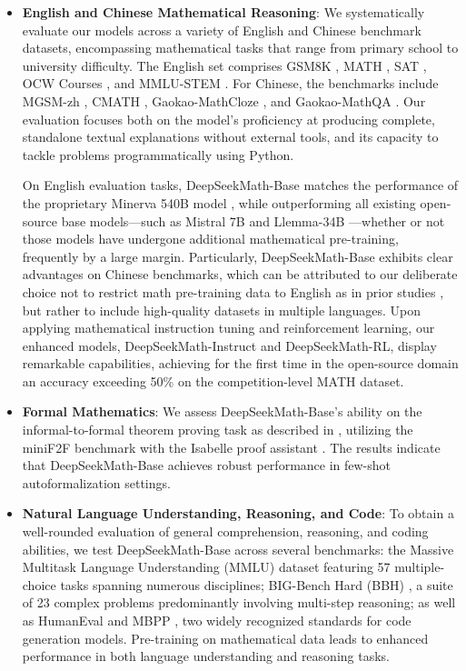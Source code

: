 \begin{itemize}[topsep=0pt]
    \item \textbf{English and Chinese Mathematical Reasoning}: We systematically evaluate our models across a variety of English and Chinese benchmark datasets, encompassing mathematical tasks that range from primary school to university difficulty. The English set comprises GSM8K \citep{gsm8k}, MATH \citep{MATH}, SAT \citep{llemma}, OCW Courses \citep{minerva}, and MMLU-STEM \citep{mmlu}. For Chinese, the benchmarks include MGSM-zh \citep{mgsm}, CMATH \citep{wei2023cmath}, Gaokao-MathCloze \citep{agieval}, and Gaokao-MathQA \citep{agieval}. Our evaluation focuses both on the model’s proficiency at producing complete, standalone textual explanations without external tools, and its capacity to tackle problems programmatically using Python.

On English evaluation tasks, DeepSeekMath-Base matches the performance of the proprietary Minerva 540B model \citep{minerva}, while outperforming all existing open-source base models—such as Mistral 7B \citep{mistral} and Llemma-34B \citep{llemma}—whether or not those models have undergone additional mathematical pre-training, frequently by a large margin. Particularly, DeepSeekMath-Base exhibits clear advantages on Chinese benchmarks, which can be attributed to our deliberate choice not to restrict math pre-training data to English as in prior studies \citep{minerva,llemma}, but rather to include high-quality datasets in multiple languages. Upon applying mathematical instruction tuning and reinforcement learning, our enhanced models, DeepSeekMath-Instruct and DeepSeekMath-RL, display remarkable capabilities, achieving for the first time in the open-source domain an accuracy exceeding 50\% on the competition-level MATH dataset.

\item \textbf{Formal Mathematics}: We assess DeepSeekMath-Base's ability on the informal-to-formal theorem proving task as described in \citep{dsp_proof}, utilizing the miniF2F benchmark \citep{minif2f} with the Isabelle proof assistant \citep{isabelle}. The results indicate that DeepSeekMath-Base achieves robust performance in few-shot autoformalization settings.
\item \textbf{Natural Language Understanding, Reasoning, and Code}: To obtain a well-rounded evaluation of general comprehension, reasoning, and coding abilities, we test DeepSeekMath-Base across several benchmarks: the Massive Multitask Language Understanding (MMLU) dataset \citep{mmlu} featuring 57 multiple-choice tasks spanning numerous disciplines; BIG-Bench Hard (BBH) \citep{bbh}, a suite of 23 complex problems predominantly involving multi-step reasoning; as well as HumanEval \citep{codex} and MBPP \citep{mbpp}, two widely recognized standards for code generation models. Pre-training on mathematical data leads to enhanced performance in both language understanding and reasoning tasks.


\end{itemize}
